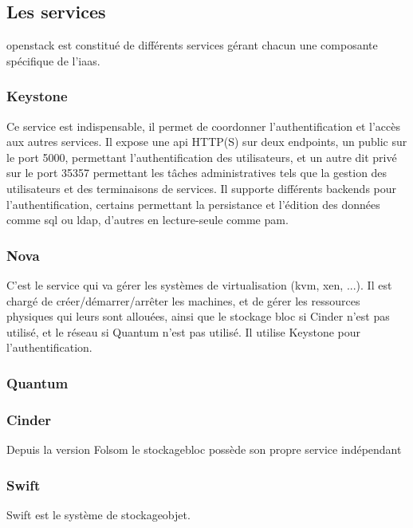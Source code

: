 \documentclass[a4paper,oneside]{report}
\begin{document}
\subsection{Les services}
\gls{openstack} est constitué de différents services gérant chacun une composante spécifique de l'\gls{iaas}.
\subsubsection{Keystone}
Ce service est indispensable, il permet de coordonner l'authentification et l'accès aux autres services.\newline
Il expose une \gls{api} HTTP(S) sur deux endpoints, un public sur le port 5000, permettant l'authentification des utilisateurs, et un autre dit privé sur le port 35357 permettant les tâches administratives tels que la gestion des utilisateurs et des terminaisons de services.
Il supporte différents backends pour l'authentification, certains permettant la persistance et l'édition des données comme \gls{sql} ou \gls{ldap}, d'autres en lecture-seule comme \gls{pam}.\newline

\subsubsection{Nova}
C'est le service qui va gérer les systèmes de \gls{virtualisation} (\gls{kvm}, \gls{xen}, ...).
Il est chargé de créer/démarrer/arrêter les machines, et de gérer les ressources physiques qui leurs sont allouées, ainsi que le stockage bloc si Cinder n'est pas utilisé, et le réseau si Quantum n'est pas utilisé.\newline
Il utilise Keystone pour l'authentification.


\subsubsection{Quantum}


\subsubsection{Cinder}
Depuis la version Folsom le \gls{stockagebloc} possède son propre service indépendant 



\subsubsection{Swift}
Swift est le système de \gls{stockageobjet}. 
\end{document}
